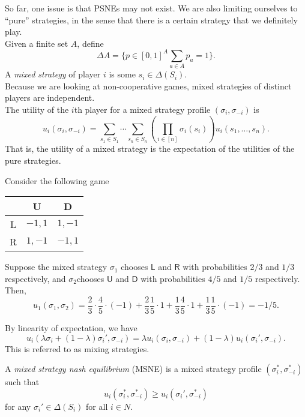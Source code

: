 	So far, one issue is that PSNEs may not exist. We are also limiting ourselves to ``pure'' strategies, in the sense that there is a certain strategy that we definitely play.\\

	Given a finite set $A$, define
	\[ \Delta A = \{ p \in [0,1]^{A} \sum_{a \in A} p_a = 1 \}. \]
	A \emph{mixed strategy} of player $i$ is some $s_i \in \Delta(S_i)$.\\
	Because we are looking at non-cooperative games, mixed strategies of distinct players are independent.\\
	The utility of the $i$th player for a mixed strategy profile $(\sigma_i,\sigma_{-i})$ is
	\[ u_i(\sigma_i,\sigma_{-i}) = \sum_{s_1 \in S_1} \cdots \sum_{s_n \in S_n} \left( \prod_{i \in [n]} \sigma_i(s_i) \right) u_i(s_1,\ldots,s_n). \]
	That is, the utility of a mixed strategy is the expectation of the utilities of the pure strategies.

	\begin{fex}
		\label{ex: mixed strategy}
		Consider the following game
		\begin{center}
		\begin{tabular}{|c||c|c|}
			\hline
			& \textsf{U} & \textsf{D} \\ \hline\hline
			\textsf{L} & $-1,1$ & $1,-1$ \\ \hline
			\textsf{R} & $1,-1$ & $-1,1$ \\ \hline
		\end{tabular}
		\end{center}
		Suppose the mixed strategy $\sigma_1$ chooses $\mathsf{L}$ and $\mathsf{R}$ with probabilities $2/3$ and $1/3$ respectively, and $\sigma_2$chooses $\mathsf{U}$ and $\mathsf{D}$ with probabilities $4/5$ and $1/5$ respectively. Then,
		\[ u_1(\sigma_1,\sigma_2) = \frac{2}{3}\cdot\frac{4}{5}\cdot(-1) + \frac{2}{3}\frac{1}{5}\cdot 1 + \frac{1}{3}\frac{4}{5}\cdot 1 + \frac{1}{3}\frac{1}{5}\cdot (-1) = -1/5. \] 
	\end{fex}

	By linearity of expectation, we have
	\begin{equation}
		\label{eqn: mixing strategies}
		u_i(\lambda \sigma_i + (1-\lambda)\sigma_i',\sigma_{-i}) = \lambda u_i(\sigma_i,\sigma_{-i}) + (1-\lambda) u_i(\sigma_i',\sigma_{-i}).
	\end{equation}
	This is referred to as mixing strategies.

	\begin{fdef}
		A \emph{mixed strategy nash equilibrium} (MSNE) is a mixed strategy profile $(\sigma_i^*,\sigma_{-i}^*)$ such that
		\[ u_i(\sigma_i^*,\sigma_{-i}^*) \ge u_i(\sigma_i',\sigma_{-i}^*) \]
		for any $\sigma_i' \in \Delta(S_i)$ for all $i \in N$.
	\end{fdef}

